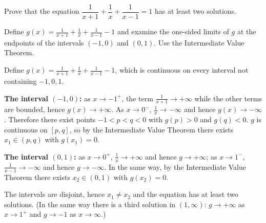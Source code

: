 
\begin{question}
Prove that the equation $\dfrac{1}{x+1}+\dfrac1x+\dfrac{1}{x-1}=1$ has at least two solutions.
\end{question}

\begin{hint}
Define $g(x)=\frac{1}{x+1}+\frac1x+\frac1{x-1}-1$ and examine the one-sided limits of $g$ at the endpoints of the intervals $(-1,0)$ and $(0,1)$. Use the Intermediate Value Theorem.
\end{hint}

\begin{solution}
Define $g(x)=\frac{1}{x+1}+\frac1x+\frac1{x-1}-1$, which is continuous on every interval not containing $-1,0,1$.

\textbf{The interval $(-1,0)$:} as $x\to-1^+$, the term $\frac1{x+1}\to+\infty$ while the other terms are bounded, hence $g(x)\to+\infty$. As $x\to0^-$, $\frac1x\to-\infty$ and hence $g(x)\to-\infty$. Therefore there exist points $-1<p<q<0$ with $g(p)>0$ and $g(q)<0$. $g$ is continuous on $[p,q]$, so by the Intermediate Value Theorem there exists $x_1\in(p,q)$ with $g(x_1)=0$.

\textbf{The interval $(0,1)$:} as $x\to0^+$, $\frac1x\to+\infty$ and hence $g\to+\infty$; as $x\to1^-$, $\frac1{x-1}\to-\infty$ and hence $g\to-\infty$. In the same way, by the Intermediate Value Theorem there exists $x_2\in(0,1)$ with $g(x_2)=0$.

The intervals are disjoint, hence $x_1\ne x_2$ and the equation has at least two solutions. (In the same way there is a third solution in $(1,\infty)$: $g\to+\infty$ as $x\to1^+$ and $g\to-1$ as $x\to\infty$.)
\end{solution}
